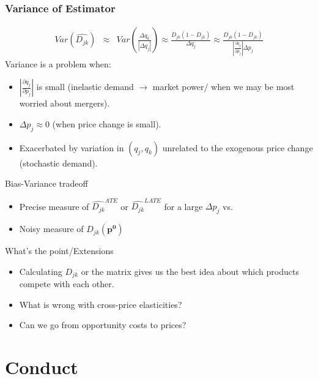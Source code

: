 \documentclass[xcolor=pdftex,dvipsnames,table,mathserif]{beamer}
\begin{document}
\begin{frame}
\frametitle{Variance of Estimator}
\footnotesize
\begin{eqnarray*}
Var(\widehat{D_{jk} })&\approx& Var\left( \frac{\Delta q_k}{|\Delta q_j|} \right)\approx \frac{D_{jk} (1-D_{jk})}{\Delta q_j} \approx \frac{D_{jk} (1-D_{jk})}{\left| \frac{\partial q_j}{\partial p_j} \right| \Delta p_j}
\end{eqnarray*}
\normalsize
Variance is a problem when:
\begin{itemize}
\item  $\left| \frac{\partial q_j}{\partial p_j} \right| $ is small (inelastic demand $\rightarrow$ market power/ when we may be most worried about mergers).
\item $\Delta p_j \approx 0 $ (when price change is small).
\item Exacerbated by variation in $(q_j,q_k)$ unrelated to the exogenous price change (stochastic demand).
\end{itemize}
Bias-Variance tradeoff
\begin{itemize}
\item Precise measure of $\widehat{D_{jk}}^{ATE}$ or $\widehat{D_{jk}}^{LATE}$ for a large $\Delta p_j$ vs.
\item Noisy measure of $D_{jk}(\mathbf{p^0})$
\end{itemize}
\end{frame}

\begin{frame}{What's the point/Extensions}
\begin{itemize}
\item Calculating $D_{jk}$ or the matrix gives us the best idea about which products compete with each other.
\item What is wrong with cross-price elasticities?
\item Can we go from opportunity costs to prices?
\end{itemize}
\end{frame}

\section{Conduct}
\end{document}
